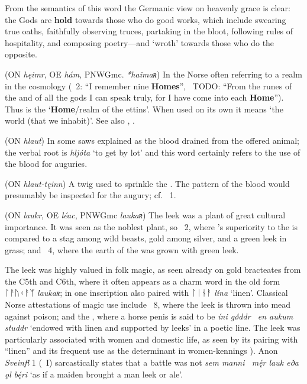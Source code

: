 \begin{itemize}
  From the semantics of this word the Germanic view on heavenly grace is clear: the Gods are \textbf{hold} towards those who do good works, which include swearing true oaths, faithfully observing truces, partaking in the bloot, following rules of hospitality, and composing poetry—and  ‘wroth’ towards those who do the opposite.

 (ON \emph{hęimr}, OE \emph{hám}, PNWGmc. \emph{*haimaʀ})
  In the Norse often referring to a realm in the cosmology (\Voluspa\ 2: “I remember nine \textbf{Homes}”, \Vafthrudnismal\ TODO: “From the runes of the  and of all the gods I can speak truly, for I have come into each \textbf{Home}”). Thus  is the ‘\textbf{Home}/realm of the ettins’. When used on its own it means ‘the world (that we inhabit)’. See also , .

 (ON \emph{hlaut})
  In some saws explained as the blood drained from the offered animal; the verbal root is \emph{hljóta} ‘to get by lot’ and this word certainly refers to the use of the blood for auguries.

 (ON \emph{hlaut-tęinn})
  A twig used to sprinkle the .  The pattern of the blood would presumably be inspected for the augury; cf. \Hymiskvida\ 1.

 (ON \emph{laukr}, OE \emph{léac}, PNWGmc \emph{laukaʀ})
  The leek was a plant of great cultural importance.  It was seen as the noblest plant, so \GudrunTwo\ 2, where ’s superiority to the  is compared to a stag among wild beasts, gold among silver, and a green leek in grass; and \Voluspa\ 4, where the earth of the  was grown with green leek.

  The leek was highly valued in folk magic, as seen already on gold bracteates from the C5th and C6th, where it often appears as a charm word in the old form {ᛚᚨᚢᚲᚨᛉ} \emph{laukaʀ}; in one inscription also paired with {ᛚᛁᚾᚨ} \emph{lína} ‘linen’.  Classical Norse attestations of magic use include \Sigrdrifumal\ 8, where the leek is thrown into mead against poison; and the \Volsathattr, where a horse penis is said to be \emph{íni gǿddr \hld\ en aukum studdr} ‘endowed with linen and supported by leeks’ in a poetic line.  The leek was particularly associated with women and domestic life, as seen by its pairing with “linen” and its frequent use as the determinant in women-kennings \parencite[418]{Meissner1921}).  Anon \emph{Sveinfl} 1 (\Skp\ I) sarcastically states that a battle was not \emph{sem manni \hld\ mę́r lauk eða ǫl bę́ri} ‘as if a maiden brought a man leek or ale’.%


\end{itemize}
